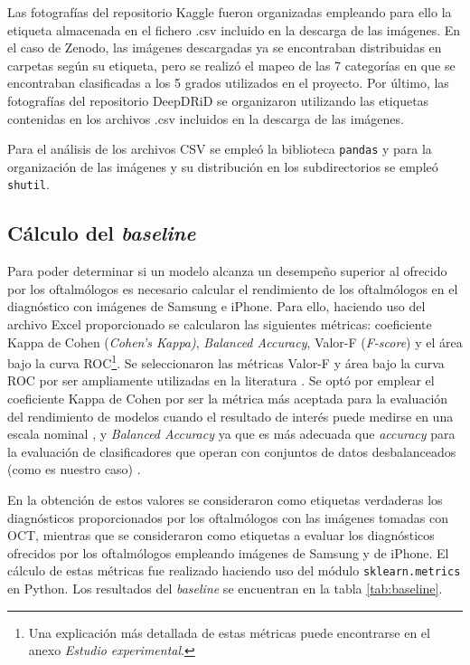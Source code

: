 Las fotografías del repositorio Kaggle fueron organizadas empleando para ello la etiqueta almacenada en el fichero .csv incluido en la descarga de las imágenes. En el caso de Zenodo, las imágenes descargadas ya se encontraban distribuidas en carpetas según su etiqueta, pero se realizó el mapeo de las 7 categorías en que se encontraban clasificadas a los 5 grados utilizados en el proyecto. Por último, las fotografías del repositorio DeepDRiD se organizaron utilizando las etiquetas contenidas en los archivos .csv incluidos en la descarga de las imágenes.

Para el análisis de los archivos CSV se empleó la biblioteca \texttt{pandas} y para la organización de las imágenes y su distribución en los subdirectorios se empleó \texttt{shutil}.

\subsection{Cálculo del \textit{baseline}}

Para poder determinar si un modelo alcanza un desempeño superior al ofrecido por los oftalmólogos es necesario calcular el rendimiento de los oftalmólogos en el diagnóstico con imágenes de Samsung e iPhone. Para ello, haciendo uso del archivo Excel proporcionado se calcularon las siguientes métricas: coeficiente Kappa de Cohen (\textit{Cohen's Kappa)}, \textit{Balanced Accuracy}, Valor-F (\textit{F-score}) y el área bajo la curva ROC\footnote{Una explicación más detallada de estas métricas puede encontrarse en el anexo \textit{Estudio experimental}.}. Se seleccionaron las métricas Valor-F y área bajo la curva ROC por ser ampliamente utilizadas en la literatura \cite{soa:mueller, soa:seetha}. Se optó por emplear el coeficiente Kappa de Cohen por ser la métrica más aceptada para la evaluación del rendimiento de modelos cuando el resultado de interés puede medirse en una escala nominal \cite{kappa:kappa}, y \textit{Balanced Accuracy} ya que es más adecuada que \textit{accuracy} para la evaluación de clasificadores que operan con conjuntos de datos desbalanceados (como es nuestro caso) \cite{bal_acc}.

En la obtención de estos valores se consideraron como etiquetas verdaderas los diagnósticos proporcionados por los oftalmólogos con las imágenes tomadas con OCT, mientras que se consideraron como etiquetas a evaluar los diagnósticos ofrecidos por los oftalmólogos empleando imágenes de Samsung y de iPhone. El cálculo de estas métricas fue realizado haciendo uso del módulo \texttt{sklearn.metrics} en Python. Los resultados del \textit{baseline} se encuentran en la tabla \ref{tab:baseline}.

